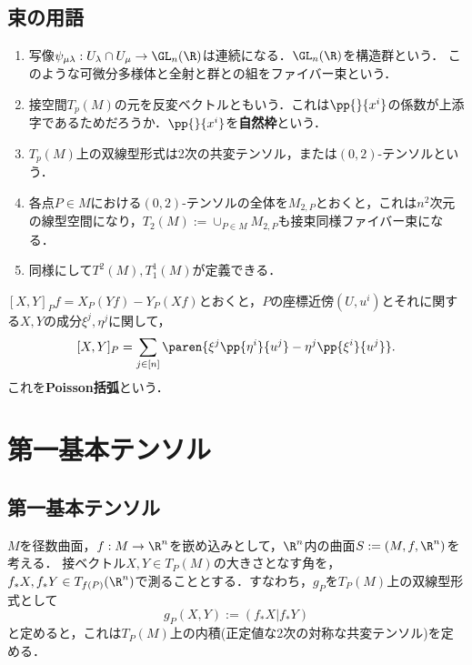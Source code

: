 \documentclass[uplatex,dvipdfmx]{jsreport}
\begin{document}
\subsection{束の用語}

\begin{remarks}\mbox{}
    \begin{enumerate}
        \item 写像$\psi_{\mu\lambda}:U_\lambda\cap U_\mu\to \GL_n(\R)$は連続になる．$\GL_n(\R)$を構造群という．
        このような可微分多様体と全射と群との組をファイバー束という．
        \item 接空間$T_p(M)$の元を反変ベクトルともいう．これは$\pp{}{x^i}$の係数が上添字であるためだろうか．$\pp{}{x^i}$を\textbf{自然枠}という．
        \item $T_p(M)$上の双線型形式は2次の共変テンソル，または$(0,2)$-テンソルという．
        \item 各点$P\in M$における$(0,2)$-テンソルの全体を$M_{2,P}$とおくと，これは$n^2$次元の線型空間になり，$T_2(M):=\cup_{P\in M}M_{2,P}$も接束同様ファイバー束になる．
        \item 同様にして$T^2(M),T_1^1(M)$が定義できる．
    \end{enumerate}
\end{remarks}

\begin{definition}
    $[X,Y]_Pf=X_P(Yf)-Y_P(Xf)$とおくと，$P$の座標近傍$(U,u^i)$とそれに関する$X,Y$の成分$\xi^j,\eta^j$に関して，
    \[[X,Y]_P=\sum_{j\in[n]}\paren{\xi^j\pp{\eta^i}{u^j}-\eta^j\pp{\xi^i}{u^j}}.\]
    これを\textbf{Poisson括弧}という．
\end{definition}

\section{第一基本テンソル}

\subsection{第一基本テンソル}

\begin{notation}
    $M$を径数曲面，$f:M\to\R^n$を嵌め込みとして，$\R^n$内の曲面$S:=(M,f,\R^n)$を考える．
    接ベクトル$X,Y\in T_P(M)$の大きさとなす角を，$f_*X,f_*Y\in T_{f(P)}(\R^n)$で測ることとする．すなわち，$g_P$を$T_P(M)$上の双線型形式として
    \[g_P(X,Y):=(f_*X|f_*Y)\]
    と定めると，これは$T_P(M)$上の内積(正定値な2次の対称な共変テンソル)を定める．
\end{notation}
\end{document}
